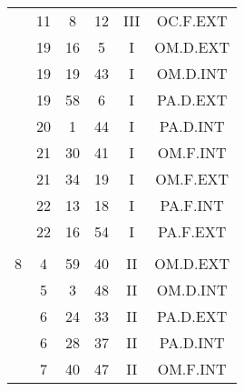 \documentclass[12pt, a4paper]{article}
\begin{document}
\begin{multicols}{3}
{\begin{tabular}{c c c c c c}
	 	 	 	 & 11 & 8 & 12 & III & OC.F.EXT\\%
	 	 	 	 & 19 & 16 & 5 & I & OM.D.EXT\\%
	 	 	 	 & 19 & 19 & 43 & I & OM.D.INT\\%
	 	 	 	 & 19 & 58 & 6 & I & PA.D.EXT\\%
	 	 	 	 & 20 & 1 & 44 & I & PA.D.INT\\%
	 	 	 	 & 21 & 30 & 41 & I & OM.F.INT\\%
	 	 	 	 & 21 & 34 & 19 & I & OM.F.EXT\\%
	 	 	 	 & 22 & 13 & 18 & I & PA.F.INT\\%
	 	 	 	 & 22 & 16 & 54 & I & PA.F.EXT\\%
	 	 	 	 & & & & & \\%
	 	 	 	8 & 4 & 59 & 40 & II & OM.D.EXT\\%
	 	 	 	 & 5 & 3 & 48 & II & OM.D.INT\\%
	 	 	 	 & 6 & 24 & 33 & II & PA.D.EXT\\%
	 	 	 	 & 6 & 28 & 37 & II & PA.D.INT\\%
	 	 	 	 & 7 & 40 & 47 & II & OM.F.INT\\%
	 	 \end{tabular}
 	}
\end{multicols}
\end{document}
